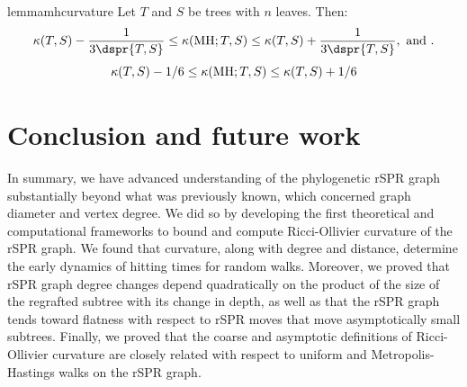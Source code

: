 \documentclass[11pt,onecolumn,conference]{IEEEtran}
\newcommand{\MH}{\operatorname{MH}}
\newcommand{\curvature}[2][]{%
    \ifthenelse{\equal{#1}{}}%
		{\kappa(#2)}%
		{\kappa_{#1}(#2)}%
}
\begin{document}
\begin{restatable}{lemma}{mhcurvature}
	\label{lem:mh_curvature}
	Let $T$ and $S$ be trees with $n$ leaves. Then:
	$$\curvature{T,S} - \frac{1}{3\dspr{T,S}}
	\le \curvature{\MH; T,S}
	\le \curvature{T,S} + \frac{1}{3\dspr{T,S}}, \text{ and }.$$
	$$\curvature{T,S} - 1/6
	\le \curvature{\MH; T,S}
	\le \curvature{T,S} + 1/6$$
\end{restatable}

\section{Conclusion and future work}
In summary, we have advanced understanding of the phylogenetic rSPR graph substantially beyond what was previously known, which concerned graph diameter and vertex degree.
We did so by developing the first theoretical and computational frameworks to bound and compute Ricci-Ollivier curvature of the rSPR graph.
We found that curvature, along with degree and distance, determine the early dynamics of hitting times for random walks.
Moreover, we proved that rSPR graph degree changes depend quadratically on the product of the size of the regrafted subtree with its change in depth, as well as that the rSPR graph tends toward flatness with respect to rSPR moves that move asymptotically small subtrees.
Finally, we proved that the coarse and asymptotic definitions of Ricci-Ollivier curvature are closely related with respect to uniform and Metropolis-Hastings walks on the rSPR graph.
\end{document}
